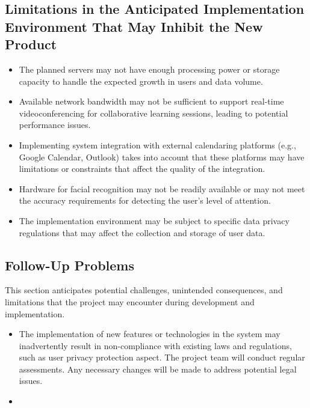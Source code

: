\documentclass[12pt]{article}
\begin{document}
\subsection{Limitations in the Anticipated Implementation Environment That May
Inhibit the New Product}
\begin{itemize}
    \item The planned servers may not have enough processing power or storage capacity to handle the expected growth in users and data volume.
    
    \item Available network bandwidth may not be sufficient to support real-time videoconferencing for collaborative learning sessions, leading to potential performance issues.
    
    \item Implementing system integration with external calendaring platforms (e.g., Google Calendar, Outlook) takes into account that these platforms may have limitations or constraints that affect the quality of the integration.
    
    \item Hardware for facial recognition may not be readily available or may not meet the accuracy requirements for detecting the user's level of attention.
    
    \item The implementation environment may be subject to specific data privacy regulations that may affect the collection and storage of user data.
\end{itemize}

\subsection{Follow-Up Problems}
This section anticipates potential challenges, unintended consequences, and limitations that the project may encounter during development and implementation.

\begin{itemize}
    \item The implementation of new features or technologies in the system may inadvertently result in non-compliance with existing laws and regulations, such as user privacy protection aspect. The project team will conduct regular assessments. Any necessary changes will be made to address potential legal issues.
    \item 
\end{itemize}
\end{document}
